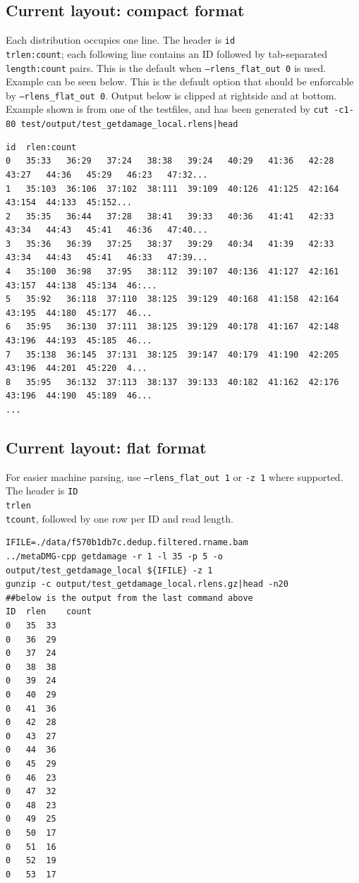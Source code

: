 \documentclass[10pt]{article}
\begin{document}
\subsection{Current layout: compact format}
Each distribution occupies one line. The header is \texttt{id\\trlen:count};
each following line contains an ID followed by tab-separated \texttt{length:count}
pairs. This is the default when \texttt{--rlens\_flat\_out 0} is used.
Example can be seen below. This is the default option that should be enforcable by \colorbox{gray!10}{\texttt{--rlens\_flat\_out 0}}. Output below is clipped at rightside and at bottom. Example shown is from one of the testfiles, and has been generated by \colorbox{gray!10}{\texttt{cut -c1-80 test/output/test\_getdamage\_local.rlens|head }}
\begin{framed}
  \small
\begin{verbatim}
id	rlen:count
0	35:33	36:29	37:24	38:38	39:24	40:29	41:36	42:28	43:27	44:36	45:29	46:23	47:32...
1	35:103	36:106	37:102	38:111	39:109	40:126	41:125	42:164	43:154	44:133	45:152...
2	35:35	36:44	37:28	38:41	39:33	40:36	41:41	42:33	43:34	44:43	45:41	46:36	47:40...
3	35:36	36:39	37:25	38:37	39:29	40:34	41:39	42:33	43:34	44:43	45:41	46:33	47:39...
4	35:100	36:98	37:95	38:112	39:107	40:136	41:127	42:161	43:157	44:138	45:134	46:...
5	35:92	36:118	37:110	38:125	39:129	40:168	41:158	42:164	43:195	44:180	45:177	46...
6	35:95	36:130	37:111	38:125	39:129	40:178	41:167	42:148	43:196	44:193	45:185	46...
7	35:138	36:145	37:131	38:125	39:147	40:179	41:190	42:205	43:196	44:201	45:220	4...
8	35:95	36:132	37:113	38:137	39:133	40:182	41:162	42:176	43:196	44:190	45:189	46...
...
\end{verbatim}
\end{framed}
\subsection{Current layout: flat format}
For easier machine parsing, use \texttt{--rlens\_flat\_out 1} or \texttt{-z 1}
where supported. The header is \texttt{ID\\trlen\\tcount}, followed by one
row per ID and read length.
\begin{framed}
  \small
\begin{verbatim}
IFILE=./data/f570b1db7c.dedup.filtered.rname.bam
../metaDMG-cpp getdamage -r 1 -l 35 -p 5 -o output/test_getdamage_local ${IFILE} -z 1
gunzip -c output/test_getdamage_local.rlens.gz|head -n20
##below is the output from the last command above
ID	rlen	count
0	35	33
0	36	29
0	37	24
0	38	38
0	39	24
0	40	29
0	41	36
0	42	28
0	43	27
0	44	36
0	45	29
0	46	23
0	47	32
0	48	23
0	49	25
0	50	17
0	51	16
0	52	19
0	53	17
\end{verbatim}
\end{framed}
\end{document}
